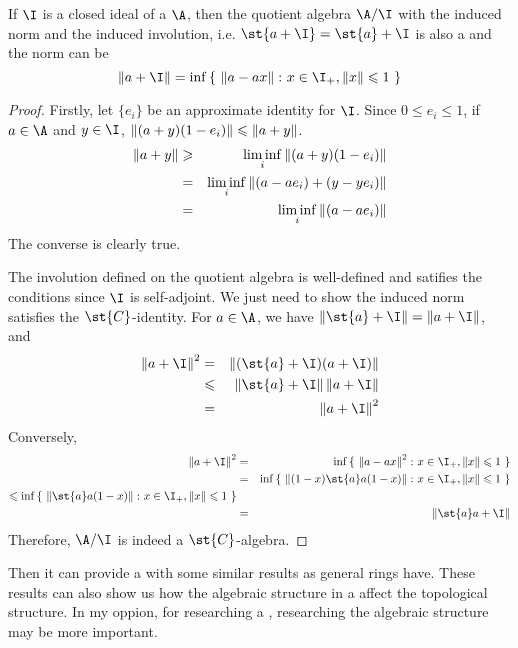 \begin{thm}
	If $\I$ is a closed ideal of a \Cs $\A$, then the quotient algebra $\A / \I$ with the induced norm and the induced involution, i.e. $\st{a+\I} = \st{a}+\I$ is also a \Cs and the norm can be
	\begin{equation*}
		\norm{a+\I} = \inf{\{~\norm{a-ax} \colon x \in \I_{+}, \norm{x} \leqslant 1~\}}
	\end{equation*}
\end{thm}
\begin{proof}
	Firstly, let $\{e_i\}$ be an approximate identity for $\I$. Since $0 \leqslant e_i \leqslant 1$, if $a \in \A$ and $y \in \I$, $\left\lVert(a+y)(1-e_i)\right\lVert \leqslant \left\lVert a+y\right\lVert$.
	\begin{eqnarray*}
		\left\lVert a+y\right\lVert &\geqslant& \liminf_{i} \left\lVert(a+y)(1-e_i)\right\lVert \\
		&=& \liminf_{i} \left\lVert(a-ae_i)+(y-ye_i)\right\lVert \\
		&=& \liminf_{i} \left\lVert(a-ae_i)\right\lVert
	\end{eqnarray*}
	The converse is clearly true.
	\item The involution defined on the quotient algebra is well-defined and satifies the conditions since $\I$ is self-adjoint. We just need to show the induced norm satisfies the $\st{C}$-identity. For $a \in \A$, we have $\norm{\st{a}+\I} = \norm{a+\I}$, and 
	\begin{eqnarray*}
		\norm{a+\I}^2 &=& \norm{(\st{a}+\I)(a+\I)} \\
		&\leqslant& \norm{\st{a}+\I}\norm{a+\I} \\
		&=& \norm{a+\I}^2
	\end{eqnarray*}
	Conversely,
	\begin{eqnarray*}
		\norm{a+\I}^2 &=& \inf{\{~\norm{a-ax}^2 \colon x \in \I_{+}, \norm{x} \leqslant 1~\}}\\
		&=& \inf{\{~\norm{(1-x)\st{a}a(1-x)} \colon x \in \I_{+}, \norm{x} \leqslant 1~\}}\\
		\leqslant \inf{\{~\norm{\st{a}a(1-x)} \colon x \in \I_{+}, \norm{x} \leqslant 1~\}}\\
		&=& \norm{\st{a}a+\I}
	\end{eqnarray*}
	Therefore, $\A / \I$ is indeed a $\st{C}$-algebra.
\end{proof}

Then it can provide a \Cs with some similar results as general rings have. These results can also show us how the algebraic structure in a \Cs affect the topological structure. In my oppion, for researching a \Cs, researching the algebraic structure may be more important.

